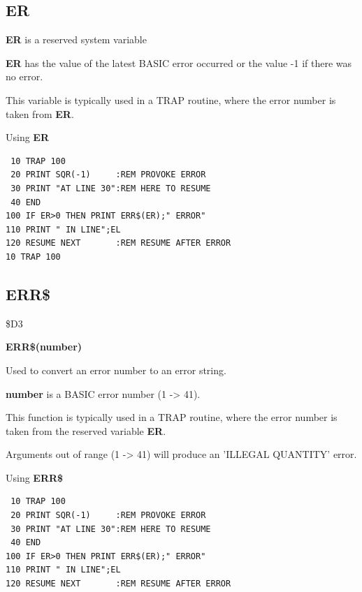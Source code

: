 \subsection{ER}
\begin{description}[leftmargin=2cm,style=nextline]
\item [Format:] {\bf ER} is a reserved system variable
\item [Usage:]  {\bf ER} has the value of the latest BASIC error
               occurred or the value -1 if there was no error.

This variable is typically used in a TRAP routine,
where the error number is taken from {\bf ER}.

\item [Example:] Using {\bf ER}
\begin{tcolorbox}[colback=black,coltext=white]
\verbatimfont{\codefont}
\begin{verbatim}
 10 TRAP 100
 20 PRINT SQR(-1)     :REM PROVOKE ERROR
 30 PRINT "AT LINE 30":REM HERE TO RESUME
 40 END
100 IF ER>0 THEN PRINT ERR$(ER);" ERROR"
110 PRINT " IN LINE";EL
120 RESUME NEXT       :REM RESUME AFTER ERROR
10 TRAP 100
\end{verbatim}
\end{tcolorbox}
\end{description}


\newpage
\subsection{ERR\$}
\begin{description}[leftmargin=2cm,style=nextline]
\item [Token:] \$D3
\item [Format:] {\bf ERR\$(number)}
\item [Usage:] Used to convert
               an error number to an error string.

   {\bf number} is a BASIC error number (1 -> 41).

This function is typically used in a TRAP routine,
where the error number is taken from the reserved variable {\bf ER}.

\item [Remarks:] Arguments out of range (1 -> 41) will
                 produce an 'ILLEGAL QUANTITY' error.

\item [Example:] Using {\bf ERR\$}
\begin{tcolorbox}[colback=black,coltext=white]
\verbatimfont{\codefont}
\begin{verbatim}
 10 TRAP 100
 20 PRINT SQR(-1)     :REM PROVOKE ERROR
 30 PRINT "AT LINE 30":REM HERE TO RESUME
 40 END
100 IF ER>0 THEN PRINT ERR$(ER);" ERROR"
110 PRINT " IN LINE";EL
120 RESUME NEXT       :REM RESUME AFTER ERROR
\end{verbatim}
\end{tcolorbox}
\end{description}

